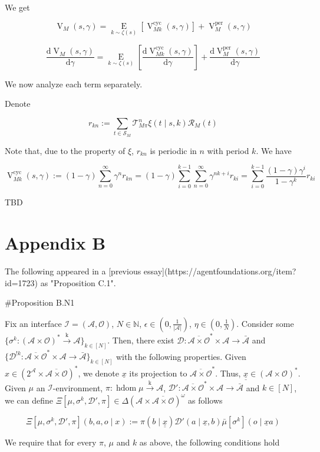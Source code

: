 \documentclass[a4paper]{article}
\newcommand{\AB}[1]{\left[#1\right]}
\newcommand{\Ea}[2]{\underset{#1}{\operatorname{E}}\AB{#2}}
\newcommand{\D}{\mathrm{d}}
\newcommand{\Nats}{\mathbb{N}}
\newcommand{\Abs}[1]{\left\vert #1 \right\vert}
\newcommand{\M}{\xrightarrow{\text{k}}}
\newcommand{\Ob}{\mathcal{O}}
\newcommand{\A}{\mathcal{A}}
\newcommand{\St}{\mathcal{S}}
\newcommand{\T}{\mathcal{T}}
\newcommand{\R}{\mathcal{R}}
\newcommand{\In}{\mathcal{I}}
\newcommand{\FH}{(\A \times \Ob)^*}
\newcommand{\Ada}{\bar{\A}}
\newcommand{\Adao}{\overline{\A \times \Ob}}
\newcommand{\Adfh}{\Adao^*}
\DeclareMathOperator{\HD}{hdom}
\newcommand{\V}{\operatorname{V}}
\newcommand{\Dl}{\mathcal{D}}
\begin{document}
We get

$$\V_M(s,\gamma) = \Ea{k \sim \zeta(s)}{\V_{Mk}^{\text{cyc}}(s,\gamma)} + \V_M^{\text{per}}(s,\gamma) $$

$$\frac{\D{\V_M(s,\gamma)}}{\D\gamma} = \Ea{k \sim \zeta(s)}{\frac{\D{\V_{Mk}^{\text{cyc}}(s,\gamma)}}{\D\gamma}} + \frac{\D{\V_M^{\text{per}}(s,\gamma)}}{\D\gamma}$$

We now analyze each term separately.

Denote

$$r_{kn}:=\sum_{t \in \St_M} \T_{M\pi}^n \xi(t \mid s,k) \R_M(t)$$

Note that, due to the property of $\xi$, $r_{kn}$ is periodic in $n$ with period $k$. We have

$$\V_{Mk}^{\text{cyc}}(s,\gamma) := (1-\gamma) \sum_{n=0}^{\infty} \gamma^{n} r_{kn} = (1-\gamma) \sum_{i=0}^{k-1}\sum_{n=0}^\infty \gamma^{nk+i} r_{ki} = \sum_{i=0}^{k-1} \frac{(1-\gamma)\gamma^i}{1-\gamma^k}r_{ki}$$

TBD

\section{Appendix B}

The following appeared in a [previous essay](https://agentfoundations.org/item?id=1723) as "Proposition C.1".

\#Proposition B.N1

Fix an interface $\In=(\A,\Ob)$, $N \in \Nats$, $\epsilon \in (0,\frac{1}{\Abs{\A}})$, $\eta \in (0,\frac{1}{N})$. Consider some $\{\sigma^k: \FH \M \A\}_{k \in [N]}$. Then, there exist $\Dl: \Adfh \times \A \rightarrow \Ada$ and $\{\Dl^{!k}: \Adfh \times \A \rightarrow \Ada\}_{k \in [N]}$ with the following properties. Given $x \in \left(2^\A \times \Adao\right)^*$, we denote $\underline{x}$ its projection to $\Adfh$. Thus, $\underline{\underline{x}}\in\FH$.
Given  $\mu$ an $\In$-environment, $\pi: \HD{\mu} \M \A$, $\Dl': \Adfh \times \A \rightarrow \Ada$ and $k \in [N]$, we can define $\Xi\left[\mu,\sigma^k,\Dl',\pi\right]\in \Delta\left(\A \times \Adao\right)^\omega$ as follows
 
$$\Xi\left[\mu,\sigma^k,\Dl',\pi\right]\left(b,a,o \mid x\right):=\pi\left(b \mid \underline{\underline{x}}\right)\Dl'\left(a \mid \underline{x},b\right) \bar{\mu}[\sigma^k]\left(o \mid \underline{x}a\right)$$

We require that for every $\pi$, $\mu$ and $k$ as above, the following conditions hold
\end{document}
